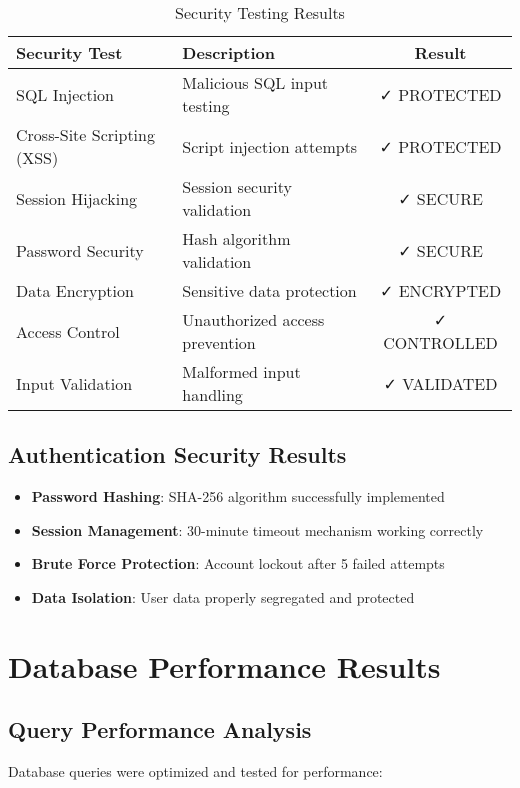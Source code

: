 \begin{table}[h]
\centering
\begin{tabular}{|l|l|c|}
\hline
\textbf{Security Test} & \textbf{Description} & \textbf{Result} \\
\hline
SQL Injection & Malicious SQL input testing & ✓ PROTECTED \\
\hline
Cross-Site Scripting (XSS) & Script injection attempts & ✓ PROTECTED \\
\hline
Session Hijacking & Session security validation & ✓ SECURE \\
\hline
Password Security & Hash algorithm validation & ✓ SECURE \\
\hline
Data Encryption & Sensitive data protection & ✓ ENCRYPTED \\
\hline
Access Control & Unauthorized access prevention & ✓ CONTROLLED \\
\hline
Input Validation & Malformed input handling & ✓ VALIDATED \\
\hline
\end{tabular}
\caption{Security Testing Results}
\end{table}

\subsection{Authentication Security Results}

\begin{itemize}
    \item \textbf{Password Hashing}: SHA-256 algorithm successfully implemented
    \item \textbf{Session Management}: 30-minute timeout mechanism working correctly
    \item \textbf{Brute Force Protection}: Account lockout after 5 failed attempts
    \item \textbf{Data Isolation}: User data properly segregated and protected
\end{itemize}

\section{Database Performance Results}

\subsection{Query Performance Analysis}

Database queries were optimized and tested for performance:


